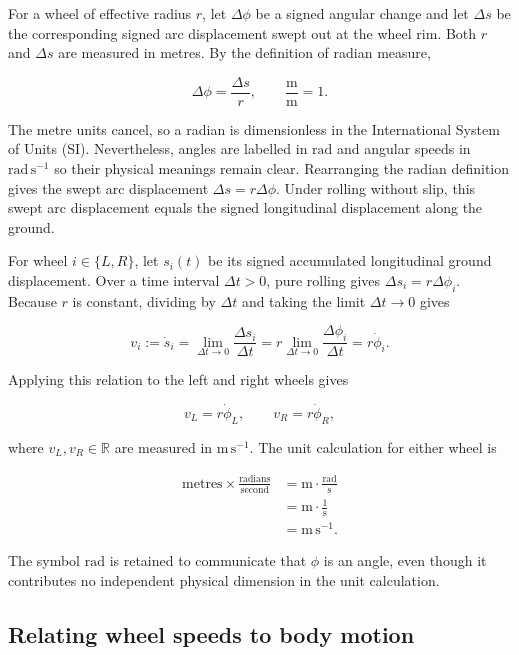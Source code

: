 \documentclass[
  australian,
  12pt,
  letterpaper,
  DIV=11,
  numbers=noendperiod,
  twoside]{scrreprt}
\begin{document}
For a wheel of effective radius \(r\), let \(\Delta\phi\) be a signed
angular change and let \(\Delta s\) be the corresponding signed arc
displacement swept out at the wheel rim. Both \(r\) and \(\Delta s\) are
measured in metres. By the definition of radian measure,

\[
\Delta\phi
=
\frac{\Delta s}{r},
\qquad
\frac{\mathrm m}{\mathrm m}=1.
\]

The metre units cancel, so a radian is dimensionless in the
International System of Units (SI). Nevertheless, angles are labelled in
\(\mathrm{rad}\) and angular speeds in \(\mathrm{rad\,s^{-1}}\) so their
physical meanings remain clear. Rearranging the radian definition gives
the swept arc displacement \(\Delta s=r\Delta\phi\). Under rolling
without slip, this swept arc displacement equals the signed longitudinal
displacement along the ground.

For wheel \(i\in\{L,R\}\), let \(s_i(t)\) be its signed accumulated
longitudinal ground displacement. Over a time interval \(\Delta t>0\),
pure rolling gives \(\Delta s_i=r\Delta\phi_i\). Because \(r\) is
constant, dividing by \(\Delta t\) and taking the limit \(\Delta t\to0\)
gives

\[
v_i
\mathrel{:=}
\dot s_i
=
\lim_{\Delta t\to0}\frac{\Delta s_i}{\Delta t}
=
r\lim_{\Delta t\to0}\frac{\Delta\phi_i}{\Delta t}
=
r\dot\phi_i.
\]

Applying this relation to the left and right wheels gives

\[
v_L=r\dot\phi_L,
\qquad
v_R=r\dot\phi_R,
\]

where \(v_L,v_R\in\mathbb R\) are measured in \(\mathrm{m\,s^{-1}}\).
The unit calculation for either wheel is

\[
\begin{aligned}
\text{metres}\times\frac{\text{radians}}{\text{second}}
&=
\mathrm m\cdot\frac{\mathrm{rad}}{\mathrm s}\\
&=
\mathrm m\cdot\frac{1}{\mathrm s}\\
&=
\mathrm{m\,s^{-1}}.
\end{aligned}
\]

The symbol \(\mathrm{rad}\) is retained to communicate that \(\phi\) is
an angle, even though it contributes no independent physical dimension
in the unit calculation.

\subsection{Relating wheel speeds to body
motion}\label{sec-wheel-speeds-body-motion}
\end{document}
